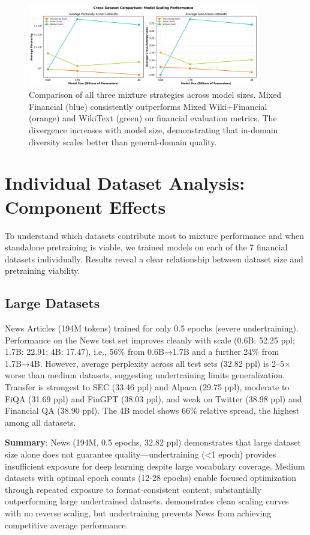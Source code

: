 \begin{figure}[h]
\centering
\includegraphics[width=0.9\textwidth]{figures/scaling_comparison_all.png}
\caption[Comparison of Mixture Strategies]{Comparison of all three mixture strategies across model sizes. Mixed Financial (blue) consistently outperforms Mixed Wiki+Financial (orange) and WikiText (green) on financial evaluation metrics. The divergence increases with model size, demonstrating that in-domain diversity scales better than general-domain quality.}
\label{fig:scaling_comparison_all}
\end{figure}

\section{Individual Dataset Analysis: Component Effects}

To understand which datasets contribute most to mixture performance and when standalone pretraining is viable, we trained models on each of the 7 financial datasets individually. Results reveal a clear relationship between dataset size and pretraining viability.

\subsection{Large Datasets}

News Articles (194M tokens) trained for only 0.5 epochs (severe undertraining). Performance on the News test set improves cleanly with scale (0.6B: 52.25 ppl; 1.7B: 22.91; 4B: 17.47), i.e., 56\% from 0.6B→1.7B and a further 24\% from 1.7B→4B. However, average perplexity across all test sets (32.82 ppl) is 2–5$\times$ worse than medium datasets, suggesting undertraining limits generalization. Transfer is strongest to SEC (33.46 ppl) and Alpaca (29.75 ppl), moderate to FiQA (31.69 ppl) and FinGPT (38.03 ppl), and weak on Twitter (38.98 ppl) and Financial QA (38.90 ppl). The 4B model shows 66\% relative spread, the highest among all datasets.

\textbf{Summary}: News (194M, 0.5 epochs, 32.82 ppl) demonstrates that large dataset size alone does not guarantee quality—undertraining (<1 epoch) provides insufficient exposure for deep learning despite large vocabulary coverage. Medium datasets with optimal epoch counts (12-28 epochs) enable focused optimization through repeated exposure to format-consistent content, substantially outperforming large undertrained datasets.  demonstrates clean scaling curves with no reverse scaling, but undertraining prevents News from achieving competitive average performance.

